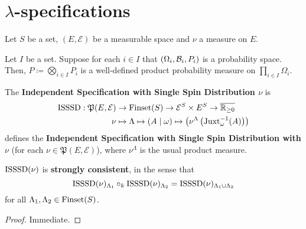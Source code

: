 \section{\texorpdfstring{$\lambda$}{Lambda}-specifications}

Let $S$ be a set, $(E, \mathcal{E})$ be a measurable space and $\nu$ a measure on $E$.

\begin{definition}
    \label{def:product-probability-measure}
    \leanok

    Let $I$ be a set. Suppose for each $i\in I$ that $(\Omega_i,\mathcal B_i,P_i)$ is a probability space. Then, $P\coloneqq\bigotimes_{i\in I}P_i$ is a well-defined product probability measure on $\prod_{i\in I}\Omega_i$.
\end{definition}

\begin{definition}
    \label{def:isssd}

    The \textbf{Independent Specification with Single Spin Distribution $\nu$} is
    \begin{align}
        \operatorname{ISSSD}:\mathfrak{P}(E, \mathcal{E})&\to\operatorname{Finset}(S)\to\mathcal{E}^S\times E^S\to\overline{\mathbb{R}_{\geq0}}\\
        \nu&\mapsto\Lambda\mapsto(A\mid\omega)\mapsto\left(\nu^\Lambda\left(\operatorname{Juxt}_{\omega}^{-1}(A)\right)\right)
    \end{align}
    defines the \textbf{Independent Specification with Single Spin Distribution with $\nu$} (for each $\nu\in\mathfrak{P}(E, \mathcal{E})$), where $\nu^\Lambda$ is the usual product measure.
\end{definition}

\begin{lemma}
    \label{lem:isssd-strong-consistency}
    \leanok

    $\operatorname{ISSSD}(\nu)$ is {\bf strongly consistent}, in the sense that
    $$\operatorname{ISSSD}(\nu)_{\Lambda_1} \circ_k \operatorname{ISSSD}(\nu)_{\Lambda_2} = \operatorname{ISSSD}(\nu)_{\Lambda_1 \cup \Lambda_2}$$
    for all $\Lambda_1, \Lambda_2 \in \operatorname{Finset}(S)$.
\end{lemma}
\begin{proof}

  Immediate.
\end{proof}

